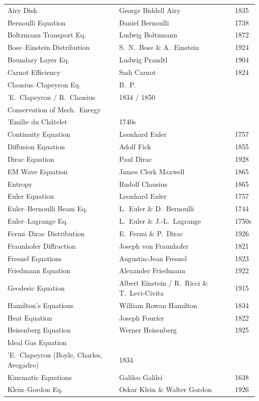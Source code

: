 \documentclass[11pt,openright]{book}
\begin{document}
\begin{longtable}{p{6cm}p{6cm}p{2.5cm}}
Airy Disk & George Biddell Airy & 1835 \\
Bernoulli Equation & Daniel Bernoulli & 1738 \\
Boltzmann Transport Eq. & Ludwig Boltzmann & 1872 \\
Bose--Einstein Distribution & S.\ N.\ Bose \& A.\ Einstein & 1924 \\
Boundary Layer Eq. & Ludwig Prandtl & 1904 \\
Carnot Efficiency & Sadi Carnot & 1824 \\
Clausius--Clapeyron Eq. & B.\ P.\ \\'E.\ Clapeyron / R.\ Clausius & 1834 / 1850 \\
Conservation of Mech.\ Energy & \\'Emilie du Ch\^atelet & 1740s \\
Continuity Equation & Leonhard Euler & 1757 \\
Diffusion Equation & Adolf Fick & 1855 \\
Dirac Equation & Paul Dirac & 1928 \\
EM Wave Equation & James Clerk Maxwell & 1865 \\
Entropy & Rudolf Clausius & 1865 \\
Euler Equation & Leonhard Euler & 1757 \\
Euler--Bernoulli Beam Eq. & L.\ Euler \& D.\ Bernoulli & 1744 \\
Euler--Lagrange Eq. & L.\ Euler \& J.-L.\ Lagrange & 1750s \\
Fermi--Dirac Distribution & E.\ Fermi \& P.\ Dirac & 1926 \\
Fraunhofer Diffraction & Joseph von Fraunhofer & 1821 \\
Fresnel Equations & Augustin-Jean Fresnel & 1823 \\
Friedmann Equation & Alexander Friedmann & 1922 \\
Geodesic Equation & Albert Einstein / R.\ Ricci \& T.\ Levi-Civita & 1915 \\
Hamilton's Equations & William Rowan Hamilton & 1834 \\
Heat Equation & Joseph Fourier & 1822 \\
Heisenberg Equation & Werner Heisenberg & 1925 \\
Ideal Gas Equation & \\'E.\ Clapeyron (Boyle, Charles, Avogadro) & 1834 \\
Kinematic Equations & Galileo Galilei & 1638 \\
Klein--Gordon Eq. & Oskar Klein \& Walter Gordon & 1926 \\

\end{longtable}
\end{document}
